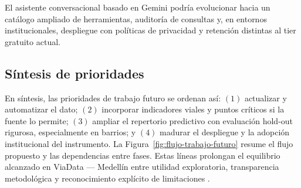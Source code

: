 El asistente conversacional basado en Gemini podría evolucionar hacia un catálogo ampliado de herramientas, auditoría de consultas y, en entornos institucionales, despliegue con políticas de privacidad y retención distintas al tier gratuito actual.

\subsection{Síntesis de prioridades}

En síntesis, las prioridades de trabajo futuro se ordenan así: $(1)$ actualizar y automatizar el dato; $(2)$ incorporar indicadores viales y puntos críticos si la fuente lo permite; $(3)$ ampliar el repertorio predictivo con evaluación hold-out rigurosa, especialmente en barrios; y $(4)$ madurar el despliegue y la adopción institucional del instrumento. La Figura~\ref{fig:flujo-trabajo-futuro} resume el flujo propuesto y las dependencias entre fases. Estas líneas prolongan el equilibrio alcanzado en ViaData — Medellín entre utilidad exploratoria, transparencia metodológica y reconocimiento explícito de limitaciones \cite{lugo2025,monar2025}.

